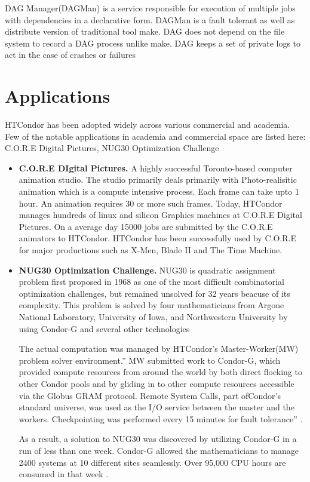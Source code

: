 \documentclass[9pt,twocolumn,twoside]{../../styles/osajnl}
\begin{document}
DAG Manager(DAGMan) is a service responsible for execution of multiple
jobs with dependencies in a declarative form. DAGMan is a fault
tolerant as well as distribute version of traditional tool make.  DAG
does not depend on the file system to record a DAG process unlike
make.  DAG keeps a set of private logs to act in the case of crashes
or failures



\section{Applications}
HTCondor has been adopted widely across various commercial and
academia. Few of the notable applications in academia and commercial
space are listed here: C.O.R.E Digital Pictures, NUG30 Optimization
Challenge


\begin{itemize}

\item{\bf C.O.R.E DIgital Pictures.} A highly successful Toronto-based
  computer animation studio. The studio primarily deals primarily with
  Photo-realisitic animation which is a compute intensive process.
  Each frame can take upto 1 hour. An animation requires 30 or more
  such frames. Today, HTCondor manages hundreds of linux and silicon
  Graphics machines at C.O.R.E Digital Pictures. On a average day
  15000 jobs are submitted by the C.O.R.E animators to
  HTCondor. HTCondor has been successfully used by C.O.R.E for major
  productions such as X-Men, Blade II and The Time Machine.

\item{\bf NUG30 Optimization Challenge.} NUG30 is quadratic assignment
  problem first proposed in 1968 as one of the most difficult
  combinatorial optimization challenges, but remained unsolved for 32
  years beacuse of its complexity. This problem is solved by four
  mathematicians from Argone National Laboratory, University of Iowa,
  and Northwestern University by using Condor-G and several other
  technologies

  The actual computation was managed by HTCondor's Master-Worker(MW)
  problem solver environment.'' MW submitted work to Condor-G, which
  provided compute resources from around the world by both direct
  flocking to other Condor pools and by gliding in to other compute
  resources accessible via the Globus GRAM protocol. Remote System
  Calls, part ofCondor’s standard universe, was used as the I/O
  service between the master and the workers. Checkpointing was
  performed every 15 minutes for fault
  tolerance''\cite{condor-practice} .

 As a result, a solution to NUG30 was discovered by utilizing Condor-G
 in a run of less than one week. Condor-G allowed the mathematicians
 to manage 2400 systems at 10 different sites seamlessly. Over 95,000
 CPU hours are consumed in that week \cite{condor-practice}.
 
\end{itemize}
\end{document}
